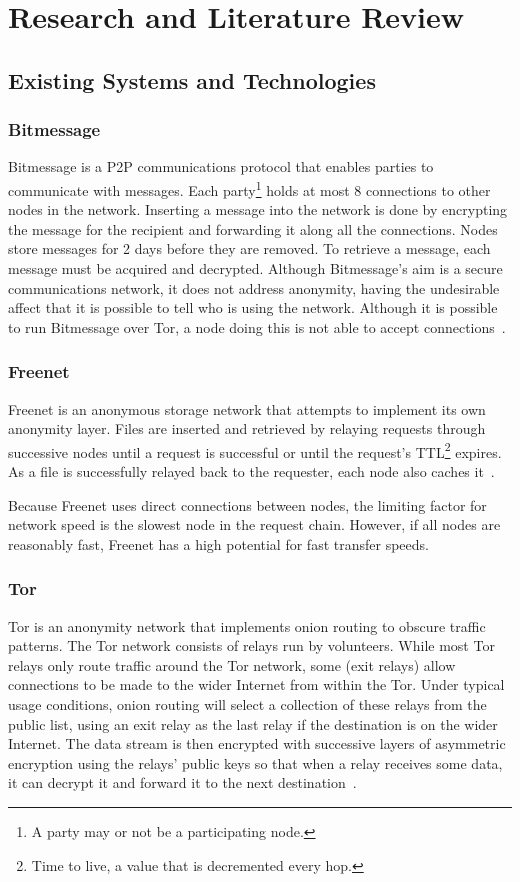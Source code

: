 \section{Research and Literature Review}
	\subsection{Existing Systems and Technologies}
		\subsubsection*{Bitmessage}\label{bitmessage_existing}
			Bitmessage is a P2P communications protocol that enables parties to communicate with messages. Each party\footnote{A party may or not be a participating node.} holds at most 8 connections to other nodes in the network. Inserting a message into the network is done by encrypting the message for the recipient and forwarding it along all the connections. Nodes store messages for 2 days before they are removed. To retrieve a message, each message must be acquired and decrypted. Although Bitmessage's aim is a secure communications network, it does not address anonymity, having the undesirable affect that it is possible to tell who is using the network. Although it is possible to run Bitmessage over Tor, a node doing this is not able to accept connections~\cite{bitmsg}.
		\subsubsection*{Freenet}\label{freenet_existing}
			Freenet is an anonymous storage network that attempts to implement its own anonymity layer. Files are inserted and retrieved by relaying requests through successive nodes until a request is successful or until the request's TTL\footnote{Time to live, a value that is decremented every hop.} expires. As a file is successfully relayed back to the requester, each node also caches it~\cite{clarke2001freenet}.
			
			Because Freenet uses direct connections between nodes, the limiting factor for network speed is the slowest node in the request chain. However, if all nodes are reasonably fast, Freenet has a high potential for fast transfer speeds.
		\subsubsection*{Tor}
			Tor is an anonymity network that implements onion routing to obscure traffic patterns. The Tor network consists of relays run by volunteers. While most Tor relays only route traffic around the Tor network, some (exit relays) allow connections to be made to the wider Internet from within the Tor. Under typical usage conditions, onion routing will select a collection of these relays from the public list, using an exit relay as the last relay if the destination is on the wider Internet. The data stream is then encrypted with successive layers of asymmetric encryption using the relays' public keys so that when a relay receives some data, it can decrypt it and forward it to the next destination~\cite{dingledine2004tor}.
			
